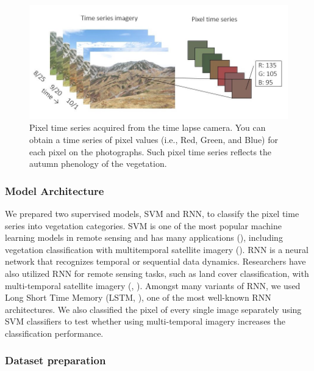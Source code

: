 \documentclass{article}
\begin{document}
\begin{figure}
\includegraphics[width=1\linewidth]{paper_files/figures/Slide1} \caption{Pixel time series acquired from the time lapse camera. You can obtain a time series of pixel values (i.e., Red, Green, and Blue) for each pixel on the photographs. Such pixel time series reflects the autumn phenology of the vegetation.}\label{fig:pixtimeseries}
\end{figure}

\hypertarget{model-architecture}{%
\subsubsection{Model Architecture}\label{model-architecture}}

We prepared two supervised models, SVM and RNN, to classify the pixel time series into vegetation categories. SVM is one of the most popular machine learning models in remote sensing and has many applications (\cite{Mountrakis2011SVMReview}), including vegetation classification with multitemporal satellite imagery (\cite{Tigges2013RemSenEnv}). RNN is a neural network that recognizes temporal or sequential data dynamics. Researchers have also utilized RNN for remote sensing tasks, such as land cover classification, with multi-temporal satellite imagery (\cite{Ienco2017RemSenLSTM}, \cite{Sharma2018NN}). Amongst many variants of RNN, we used Long Short Time Memory (LSTM, \cite{Hochreiter1997LSTM}), one of the most well-known RNN architectures. We also classified the pixel of every single image separately using SVM classifiers to test whether using multi-temporal imagery increases the classification performance.

\hypertarget{dataset-preparation}{%
\subsubsection{Dataset preparation}\label{dataset-preparation}}
\end{document}
